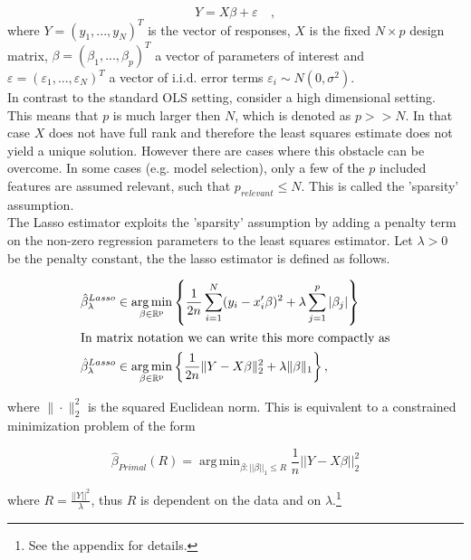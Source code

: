 \documentclass{article}
\theoremstyle{definition}
\DeclareMathOperator*{\argmin}{arg\,min}
\begin{document}
\begin{equation}
	Y=X\beta+\varepsilon\quad,
\end{equation}
%
where $Y=(y_{1},...,y_{N})^T$ is the vector of responses, $X$ is the fixed $N \times p$ design matrix, $\beta=(\beta_1,...,\beta_p)^T$ a vector of parameters of interest and $\varepsilon=(\varepsilon_1,...,\varepsilon_N)^T$ a vector of i.i.d. error terms $\varepsilon_i \sim N(0,\sigma^2)$.\\
In contrast to the standard OLS setting, consider a high dimensional setting. This means that $p$ is much larger then $N$, which is denoted as $p>>N$. In that case $X$ does not have full rank and therefore the least squares estimate does not yield a unique solution. However there are cases where this obstacle can be overcome. In some cases (e.g. model selection), only a few of the $p$ included features are assumed relevant, such that $p_{relevant}\leq N$. This is called the 'sparsity' assumption.\\
The Lasso estimator exploits the 'sparsity' assumption by adding a penalty term on the non-zero regression parameters to the least squares estimator. Let $\lambda>0$ be the penalty constant, the the lasso estimator is defined as follows.

\begin{align}
\hat{\beta}_{\lambda}^{Lasso}&\in\argmin_{\beta \in\rm \mathbb{R}^p} \left \{ \frac{1}{2n}  \sum_{i=1}^{N}(y_{i}-x_{i}'\beta)^2+\lambda \sum_{j=1}^p|\beta_j| \right\}\\
\shortintertext{In matrix notation we can write this more compactly as}
\hat{\beta}_{\lambda}^{Lasso}&\in\argmin_{\beta \in\rm \mathbb{R}^p}  \left\{\frac{1}{2n} \| Y-X\beta\|_2^2+\lambda \| \beta\|_1 \right\}, \label{LassoLambda}
\end{align} 

\noindent where $ \| \cdot \|_2^2 $ is the squared Euclidean norm. This is equivalent to a constrained minimization problem of the form 

\begin{equation}
\hat{\beta}_{Primal}(R)=\argmin_{\beta:||\beta||_1\leq R} \frac{1}{n}||Y-X\beta||_2^2 \label{Primal}
\end{equation} 

\noindent where $R = \frac{||Y||^2}{\lambda}$, thus $R$ is dependent on the data and on $\lambda$.\footnote{See the appendix for details.}
\end{document}
